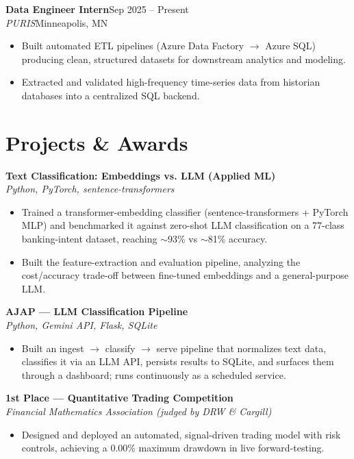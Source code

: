 \documentclass[letterpaper,10.5pt]{article}
\newcommand{\entry}[4]{\textbf{#1}\hfill{\small #2}\\\textit{\small #3}\hfill{\small #4}\par\vspace{1pt}}
\begin{document}
\entry{Data Engineer Intern}{Sep 2025 -- Present}{PURIS}{Minneapolis, MN}
\begin{itemize}
  \item Built automated ETL pipelines (Azure Data Factory $\rightarrow$ Azure SQL) producing clean, structured datasets for downstream analytics and modeling.
  \item Extracted and validated high-frequency time-series data from historian databases into a centralized SQL backend.
\end{itemize}

\section{Projects \& Awards}
\entry{Text Classification: Embeddings vs. LLM (Applied ML)}{}{Python, PyTorch, sentence-transformers}{}
\begin{itemize}
  \item Trained a transformer-embedding classifier (sentence-transformers + PyTorch MLP) and benchmarked it against zero-shot LLM classification on a 77-class banking-intent dataset, reaching $\sim$93\% vs $\sim$81\% accuracy.
  \item Built the feature-extraction and evaluation pipeline, analyzing the cost/accuracy trade-off between fine-tuned embeddings and a general-purpose LLM.
\end{itemize}

\entry{AJAP --- LLM Classification Pipeline}{}{Python, Gemini API, Flask, SQLite}{}
\begin{itemize}
  \item Built an ingest $\rightarrow$ classify $\rightarrow$ serve pipeline that normalizes text data, classifies it via an LLM API, persists results to SQLite, and surfaces them through a dashboard; runs continuously as a scheduled service.
\end{itemize}

\entry{1st Place --- Quantitative Trading Competition}{}{Financial Mathematics Association (judged by DRW \& Cargill)}{}
\begin{itemize}
  \item Designed and deployed an automated, signal-driven trading model with risk controls, achieving a 0.00\% maximum drawdown in live forward-testing.
\end{itemize}
\end{document}
